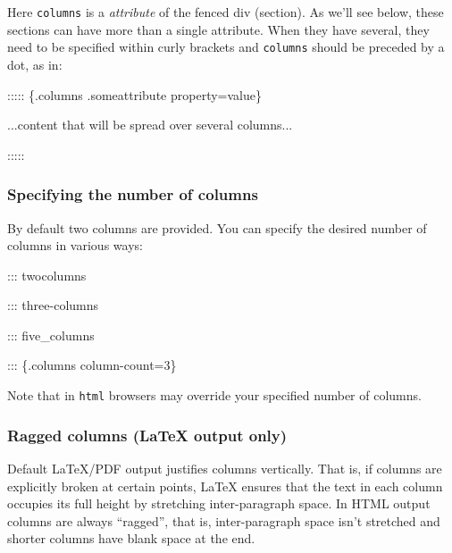 \documentclass[
]{article}
\newenvironment{Shaded}{}{}
\newcommand{\NormalTok}[1]{#1}
\begin{document}
Here \texttt{columns} is a \emph{attribute} of the fenced div (section).
As we'll see below, these sections can have more than a single
attribute. When they have several, they need to be specified within
curly brackets and \texttt{columns} should be preceded by a dot, as in:

\begin{Shaded}
\begin{Highlighting}[]
\NormalTok{::::: \{.columns .someattribute property=value\}}

\NormalTok{...content that will be spread over several columns...}

\NormalTok{:::::}
\end{Highlighting}
\end{Shaded}

\hypertarget{specifying-the-number-of-columns}{%
\subsubsection{Specifying the number of
columns}\label{specifying-the-number-of-columns}}

By default two columns are provided. You can specify the desired number
of columns in various ways:

\begin{Shaded}
\begin{Highlighting}[]
\NormalTok{::: twocolumns}

\NormalTok{::: three{-}columns}

\NormalTok{::: five\_columns}

\NormalTok{::: \{.columns column{-}count=3\}}
\end{Highlighting}
\end{Shaded}

Note that in \texttt{html} browsers may override your specified number
of columns.

\hypertarget{ragged-columns-latex-output-only}{%
\subsubsection{Ragged columns (LaTeX output
only)}\label{ragged-columns-latex-output-only}}

Default LaTeX/PDF output justifies columns vertically. That is, if
columns are explicitly broken at certain points, LaTeX ensures that the
text in each column occupies its full height by stretching
inter-paragraph space. In HTML output columns are always ``ragged'',
that is, inter-paragraph space isn't stretched and shorter columns have
blank space at the end.
\end{document}
